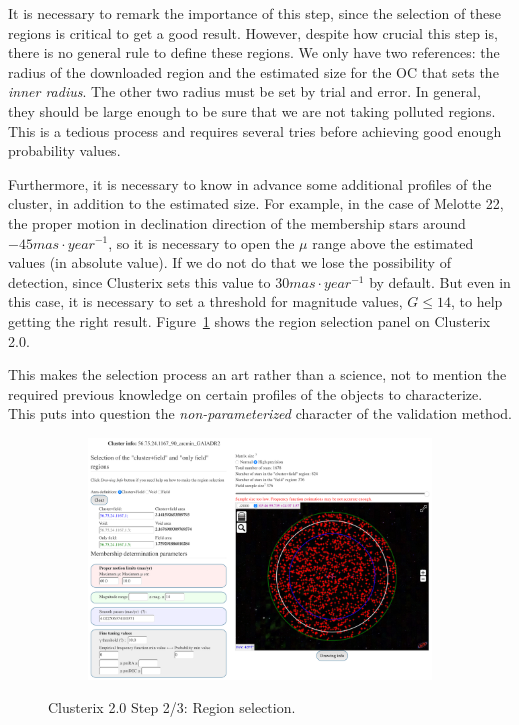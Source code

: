 \documentclass[11pt, a4paper, english]{book}
\begin{document}
It is necessary to remark the importance of this step,
since the selection of these regions is critical to get a good result.
However, despite how crucial this step is, there is no general rule to define these regions.
We only have two references:
the radius of the downloaded region and the estimated size for the OC that sets the \emph{inner radius}.
The other two radius must be set by trial and error.
In general, they should be large enough to be sure that we are not taking polluted regions.
This is a tedious process and requires several tries before achieving good enough probability values.

Furthermore, it is necessary to know in advance some additional profiles of the cluster,
in addition to the estimated size.
For example, in the case of Melotte 22, the proper motion in declination direction
of the membership stars around \(-45 mas \cdot year^{-1}\),
so it is necessary to open the \(\mu\) range above the estimated values (in absolute value).
If we do not do that we lose the possibility of detection,
since Clusterix sets this value to \(30 mas \cdot year^{-1}\) by default.
But even in this case, it is necessary to set a threshold for magnitude values,
\(G \leq 14\), to help getting the right result.
Figure~\ref{fig:clusterix_step2_melotte_22} shows the region selection panel on Clusterix 2.0.

This makes the selection process an art rather than a science,
not to mention the required previous knowledge on certain profiles of the objects to characterize.
This puts into question the \emph{non-parameterized} character of the validation method.

\begin{figure}[htbp]
  \centering
  \begin{subfigure}{0.9\textwidth}
    \centering
    \includegraphics[width=\textwidth]{../figures/clusterix/clusterix_step2_melotte_22.png}
  \end{subfigure}
  \caption{Clusterix 2.0 Step 2/3: Region selection.}
  \label{fig:clusterix_step2_melotte_22}
\end{figure}
\end{document}
